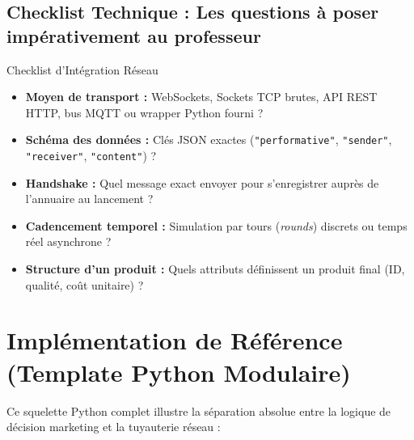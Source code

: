 \documentclass[11pt,a4paper]{article}
\begin{document}
\subsection{Checklist Technique : Les questions à poser impérativement au professeur}
\begin{alertbox}{Checklist d'Intégration Réseau}
\begin{itemize}[leftmargin=*, itemsep=1.5pt]
    \item[\textbf{[ ]}] \textbf{Moyen de transport :} WebSockets, Sockets TCP brutes, API REST HTTP, bus MQTT ou wrapper Python fourni ?
    \item[\textbf{[ ]}] \textbf{Schéma des données :} Clés JSON exactes (\texttt{"performative"}, \texttt{"sender"}, \texttt{"receiver"}, \texttt{"content"}) ?
    \item[\textbf{[ ]}] \textbf{Handshake :} Quel message exact envoyer pour s'enregistrer auprès de l'annuaire au lancement ?
    \item[\textbf{[ ]}] \textbf{Cadencement temporel :} Simulation par tours (\textit{rounds}) discrets ou temps réel asynchrone ?
    \item[\textbf{[ ]}] \textbf{Structure d'un produit :} Quels attributs définissent un produit final (ID, qualité, coût unitaire) ?
\end{itemize}
\end{alertbox}

\section{Implémentation de Référence (Template Python Modulaire)}

Ce squelette Python complet illustre la séparation absolue entre la logique de décision marketing et la tuyauterie réseau :
\end{document}

